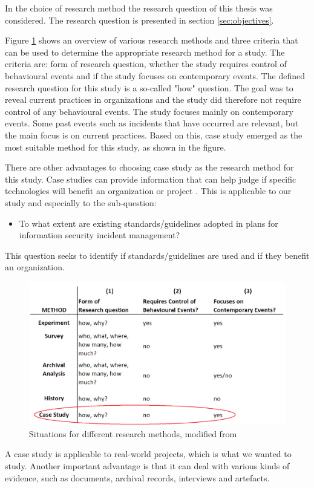 \label{sec:choiceOfMethod}
In the choice of research method the research question of this thesis was considered. The research question is presented in section \ref{sec:objectives}.

Figure \ref{fig:methods} shows an overview of various research methods and three criteria that can be used to determine the appropriate research method for a study. The criteria are: form of research question, whether the study requires control of behavioural events and if the study focuses on contemporary events. The defined research question for this study is a so-called "how" question. The goal was to reveal current practices in organizations and the study did therefore not require control of any behavioural events. The study focuses mainly on contemporary events. Some past events such as incidents that have occurred are relevant, but the main focus is on current practices. Based on this, case study emerged as the most suitable method for this study, as shown in the figure.

There are other advantages to choosing case study as the research method for this study. Case studies can provide information that can help judge if specific technologies will benefit an organization or project \cite{kitchenham1995case}. This is applicable to our study and especially to the sub-question:

\begin{itemize}
\item To what extent are existing standards/guidelines adopted in plans for information security incident management?
\end{itemize}

This question seeks to identify if standards/guidelines are used and if they benefit an organization.

\begin{figure}[H]
\begin{center}
\includegraphics[scale=0.35]{methods.png}
\caption[Situations for different research methods]{Situations for different research methods, modified from \cite{CaseStudyResearch}}
\label{fig:methods}
\end{center}
\end{figure}

A case study is applicable to real-world projects, which is what we wanted to study. Another important advantage is that it can deal with various kinds of evidence, such as documents, archival records, interviews and artefacts.